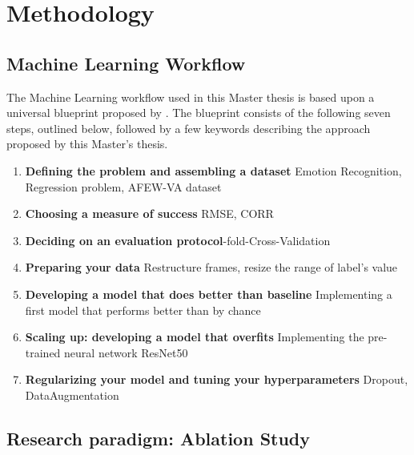 \chapter{Methodology}

\section{Machine Learning Workflow}
The Machine Learning workflow used in this Master thesis is based upon a universal blueprint proposed by \citet{Chollet:2017:DeepLearningPython}. The blueprint consists of the following seven steps, outlined below, followed by a few keywords describing the approach proposed by this Master's thesis.

\begin{enumerate}
    \item \textbf{Defining the problem and assembling a dataset}\newline
    Emotion Recognition, Regression problem, AFEW-VA dataset
    \item \textbf{Choosing a measure of success}\newline
    RMSE, CORR
    \item \textbf{Deciding on an evaluation protocol}-fold-Cross-Validation
    \item \textbf{Preparing your data}\newline
    Restructure frames, resize the range of label's value
    \item \textbf{Developing a model that does better than baseline}\newline
    Implementing a first model that performs better than by chance
    \item \textbf{Scaling up: developing a model that overfits}\newline
    Implementing the pre-trained neural network ResNet50
    \item \textbf{Regularizing your model and tuning your hyperparameters}\newline
    Dropout, DataAugmentation
\end{enumerate}



\section{Research paradigm: Ablation Study}

